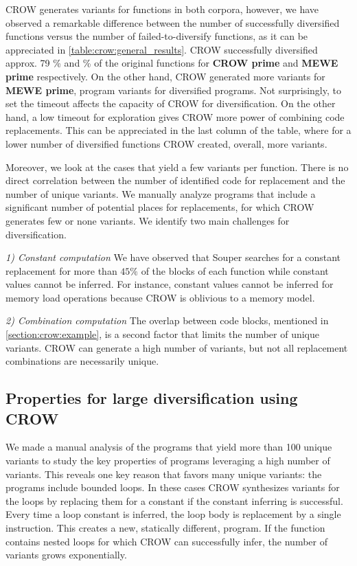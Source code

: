 CROW generates variants for functions in both corpora, however, we have observed a remarkable difference between the number of successfully diversified functions versus the number of failed-to-diversify functions, as it can be appreciated in \autoref{table:crow:general_results}. CROW successfully diversified approx. 79 \% and \% of the original functions for \textbf{CROW prime} and  \textbf{MEWE prime} respectively. On the other hand, CROW generated more variants for \textbf{MEWE prime}, \py{\allmewepopulation} program variants for \py{\allmewediversified} diversified programs. Not surprisingly, to set the timeout affects the capacity of CROW for diversification. On the other hand, a low timeout for exploration gives CROW more power of combining code replacements. This can be appreciated in the last column of the table, where for a lower number of diversified functions CROW created, overall, more variants.


Moreover, we look at the cases that yield a few variants per function. There is no direct correlation between the number of identified code for replacement and the number of unique variants. We manually analyze programs that include a significant number of potential places for replacements, for which CROW generates few or none variants. 
We identify two main challenges for diversification.

\emph{1) Constant computation}  We have observed that Souper searches for a constant replacement for more than $45\%$ of the blocks of each function while constant values cannot be inferred. For instance,  constant values cannot be inferred for memory load operations because CROW is oblivious to a memory model. 


\emph{2) Combination computation}  The overlap between code blocks, mentioned in \autoref{section:crow:example}, is a second factor that limits the number of unique variants. CROW can generate a high number of variants, but not all replacement combinations are necessarily unique. 



\subsection{Properties for large diversification using CROW}

We made a manual analysis of the programs that yield more than 100 unique variants to study the key properties of programs leveraging a high number of variants.
This reveals one key reason that favors many unique variants: the programs include  bounded loops. In these cases CROW
synthesizes variants for the loops by replacing them for a constant if the constant inferring is successful. Every time a loop constant is inferred, the loop body is replacement by a single instruction. This creates a new, statically different, program. If the function contains nested loops for which CROW can successfully infer, the number of variants grows exponentially. 

